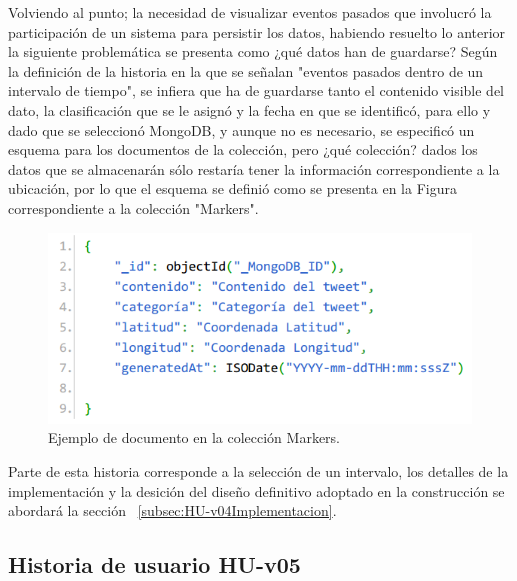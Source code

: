Volviendo al punto; la necesidad de visualizar eventos pasados que involucró la participación de un sistema para persistir los datos, habiendo resuelto lo anterior la siguiente problemática se presenta como ¿qué datos han de guardarse? Según la definición de la historia en la que se señalan "eventos pasados dentro de un intervalo de tiempo", se infiera que ha de guardarse tanto el contenido visible del dato, la clasificación que se le asignó y la fecha en que se identificó, para ello y dado que se seleccionó MongoDB, y aunque no es necesario, se especificó un esquema para los documentos de la colección, pero ¿qué colección? dados los datos que se almacenarán sólo restaría tener la información correspondiente a la ubicación, por lo que el esquema se definió como se presenta en la Figura ~ correspondiente a la colección "Markers".

\begin{figure}[H]
	\centering
	\captionsetup{justification=centering}
	\includegraphics[scale=0.8]{images/Marker1.png}
	\caption[Ejemplo de documento en la colección Markers.]{Ejemplo de documento en la colección Markers.}
	\label{fig:esquemaMarker1}
\end{figure}

Parte de esta historia corresponde a la selección de un intervalo, los detalles de la implementación y la desición del diseño definitivo adoptado en la construcción se abordará la sección ~\ref{subsec:HU-v04Implementacion}.

\subsection{Historia de usuario HU-v05}
\label{subsec:HU-v05}

